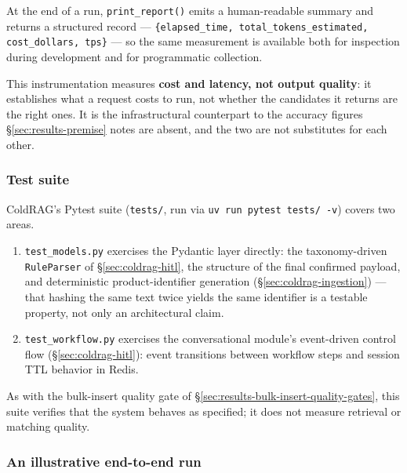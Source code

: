 At the end of a run, \texttt{print\_report()} emits a human-readable summary and returns a structured record — \texttt{\{elapsed\_time, total\_tokens\_estimated, cost\_dollars, tps\}} — so the same measurement is available both for inspection during development and for programmatic collection.

\vspace{0.3cm}

This instrumentation measures \textbf{cost and latency, not output quality}: it establishes what a request costs to run, not whether the candidates it returns are the right ones. It is the infrastructural counterpart to the accuracy figures \S\ref{sec:results-premise} notes are absent, and the two are not substitutes for each other.

\subsubsection{Test suite}
\label{sec:results-coldrag-tests}

ColdRAG's Pytest suite (\texttt{tests/}, run via \texttt{uv run pytest tests/ -v}) covers two areas. 
\begin{enumerate}
\item \texttt{test\_models.py} exercises the Pydantic layer directly: the taxonomy-driven \texttt{RuleParser} of \S\ref{sec:coldrag-hitl}, the structure of the final confirmed payload, and deterministic product-identifier generation (\S\ref{sec:coldrag-ingestion}) — that hashing the same text twice yields the same identifier is a testable property, not only an architectural claim. 
\item \texttt{test\_workflow.py} exercises the conversational module's event-driven control flow (\S\ref{sec:coldrag-hitl}): event transitions between workflow steps and session TTL behavior in Redis. 
\end{enumerate}

\vspace{0.3cm}

As with the bulk-insert quality gate of \S\ref{sec:results-bulk-insert-quality-gates}, this suite verifies that the system behaves as specified; it does not measure retrieval or matching quality.

\subsubsection{An illustrative end-to-end run}
\label{sec:results-coldrag-run}

